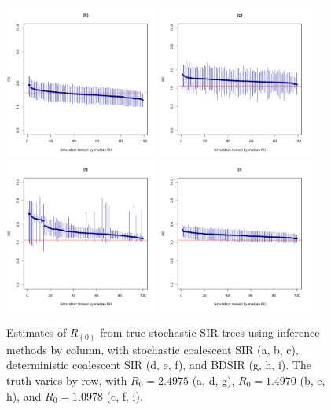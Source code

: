 \documentclass[12pt,titlepage]{article}
\newcommand{\stochCoalSIR}{stochastic coalescent SIR}
\newcommand{\deterCoalSIR}{deterministic coalescent SIR}
\newcommand{\BDSIR}{BDSIR}
\begin{document}
\begin{figure}[ht]
{}
\quad
{%
    	\includegraphics[width=1.99in]{R0_lowerS0_BDSIR_FINAL.pdf}
}
\quad
{%
    	\includegraphics[width=1.99in]{R0_lowestR0_stochSIR_FINAL.pdf}
}
\quad
{%
    	\includegraphics[width=1.99in]{R0_lowestR0_deterSIR_FINAL.pdf}
}
\quad
{%
    	\includegraphics[width=1.99in]{R0_lowestR0_BDSIR_FINAL.pdf}
}
\caption{Estimates of $R_{(0)}$ from true stochastic SIR trees using inference methods by column, with 
	\stochCoalSIR{} (a, b, c), \deterCoalSIR{} (d, e, f), and \BDSIR{} (g, h, i).  The truth varies 
	by row, with $R_{0}=2.4975$ (a, d, g), $R_{0}=1.4970$ (b, e, h), and $R_{0}=1.0978$ (c, f, i).
}
\label{fig:blah}
\end{figure}
\end{document}
